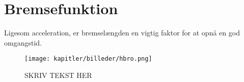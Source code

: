 
\section{Bremsefunktion}

Ligesom acceleration, er bremselængden en vigtig faktor for at opnå en god omgangstid.


\begin{figure}[ht]
    \centering
    \texttt{[image: kapitler/billeder/hbro.png]}
    \caption{SKRIV TEKST HER}
    \label{fig:hbro}
\end{figure}
